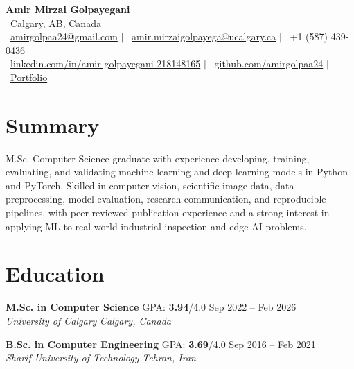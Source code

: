 \documentclass[a4paper,10pt]{article}
\newcommand{\resumeEducationSubheading}[5]{
    \textbf{#1} \hfill #2 \hfill #3 \\
    \textit{#4} \hfill \textit{#5}
}
\begin{document}

\begin{center}
    {\LARGE \textbf{Amir Mirzai Golpayegani}} \\[0.25em]
    \faMapMarker*~Calgary, AB, Canada \\[0.25em]
    \faEnvelope~\href{mailto:amirgolpaa24@gmail.com}{amirgolpaa24@gmail.com}
    $|$
    \faEnvelope~\href{mailto:amir.mirzaigolpayega@ucalgary.ca}{amir.mirzaigolpayega@ucalgary.ca}
    $|$
    \faPhone*~+1 (587) 439-0436 \\[0.25em]
    \faLinkedin~\href{https://linkedin.com/in/amir-golpayegani-218148165}{linkedin.com/in/amir-golpayegani-218148165}
    $|$
    \faGithub~\href{https://github.com/amirgolpaa24}{github.com/amirgolpaa24}
    $|$
    \faGlobe~\href{https://amir-portfolio-navy.vercel.app/}{Portfolio}
\end{center}


\section*{Summary}

M.Sc. Computer Science graduate with experience developing, training, evaluating, and validating machine learning and deep learning models in Python and PyTorch. Skilled in computer vision, scientific image data, data preprocessing, model evaluation, research communication, and reproducible pipelines, with peer-reviewed publication experience and a strong interest in applying ML to real-world industrial inspection and edge-AI problems.


\section*{Education}

\resumeEducationSubheading
{M.Sc. in Computer Science}
{GPA: \textbf{3.94}/4.0}
{Sep 2022 -- Feb 2026}
{University of Calgary}
{Calgary, Canada}

\vspace{0.35em}

\resumeEducationSubheading
{B.Sc. in Computer Engineering}
{GPA: \textbf{3.69}/4.0}
{Sep 2016 -- Feb 2021}
{Sharif University of Technology}
{Tehran, Iran}

\end{document}
